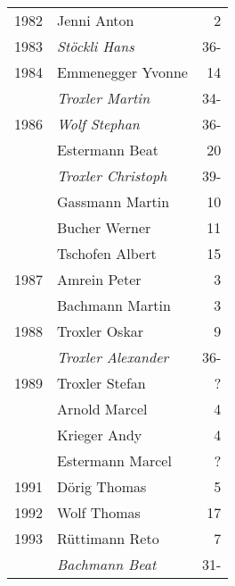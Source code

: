 {\begin{longtable}{ l l r }
        1982          & Jenni Anton                               & 2           \\
        1983          & \emph{Stöckli Hans}                       & 36-         \\
        1984          & Emmenegger Yvonne                         & 14          \\
                      & \emph{Troxler Martin}                     & 34-         \\
        1986          & \emph{Wolf Stephan}                       & 36-         \\
                      & Estermann Beat                            & 20          \\
                      & \emph{Troxler Christoph}                  & 39-         \\
                      & Gassmann Martin                           & 10          \\
                      & Bucher Werner                             & 11          \\
                      & Tschofen Albert                           & 15          \\
        1987          & Amrein Peter                              & 3           \\
                      & Bachmann Martin                           & 3           \\
        1988          & Troxler Oskar                             & 9           \\
                      & \emph{Troxler Alexander}                  & 36-         \\
        1989          & Troxler Stefan                            & ?           \\
                      & Arnold Marcel                             & 4           \\
                      & Krieger Andy                              & 4           \\
                      & Estermann Marcel                          & ?           \\
        1991          & Dörig Thomas                              & 5           \\
        1992          & Wolf Thomas                               & 17          \\
        1993          & Rüttimann Reto                            & 7           \\
                      & \emph{Bachmann Beat}                      & 31-         \\

\end{longtable}}

